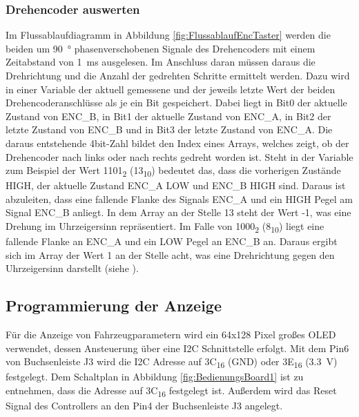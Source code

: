 \subsubsection{Drehencoder auswerten}\label{sec:Drehencoder}
Im Flussablaufdiagramm in Abbildung \ref{fig:FlussablaufEncTaster} werden die beiden um \SI{90}{\degree} phasenverschobenen Signale des Drehencoders mit einem Zeitabstand von \SI{1}{\milli\second} ausgelesen. Im Anschluss daran müssen daraus die Drehrichtung und die Anzahl der gedrehten Schritte ermittelt werden. Dazu wird in einer Variable der aktuell gemessene und der jeweils letzte Wert der beiden Drehencoderanschlüsse als je ein Bit gespeichert. Dabei liegt in Bit0 der aktuelle Zustand von ENC\_B, in Bit1 der aktuelle Zustand von ENC\_A, in Bit2 der letzte Zustand von ENC\_B und in Bit3 der letzte Zustand von ENC\_A. Die daraus entstehende 4bit-Zahl bildet den Index eines Arrays, welches zeigt, ob der Drehencoder nach links oder nach rechts gedreht worden ist. Steht in der Variable zum Beispiel der Wert 1101\textsubscript{2} (13\textsubscript{10}) bedeutet das, dass die vorherigen Zustände HIGH, der aktuelle Zustand ENC\_A LOW und ENC\_B HIGH sind. Daraus ist abzuleiten, dass eine fallende Flanke des Signals ENC\_A und ein HIGH Pegel am Signal ENC\_B anliegt. In dem Array an der Stelle 13 steht der Wert -1, was eine Drehung im Uhrzeigersinn repräsentiert. Im Falle von 1000\textsubscript{2} (8\textsubscript{10}) liegt eine fallende Flanke an ENC\_A und ein LOW Pegel an ENC\_B an. Daraus ergibt sich im Array der Wert 1 an der Stelle acht, was eine Drehrichtung gegen den Uhrzeigersinn darstellt (siehe \cite{ENC}).
\newpage
\subsection{Programmierung der Anzeige}\label{Sec6Sub2}
Für die Anzeige von Fahrzeugparametern wird ein 64x128 Pixel großes \ac{OLED} verwendet, dessen Ansteuerung über eine \ac{I2C} Schnittstelle erfolgt.  Mit dem Pin6 von Buchsenleiste J3 wird die \ac{I2C} Adresse auf 3C\textsubscript{16} (GND) oder 3E\textsubscript{16} (\SI{3,3}{\volt}) festgelegt. Dem Schaltplan in Abbildung \ref{fig:BedienungsBoard1} ist zu entnehmen, dass die Adresse auf 3C\textsubscript{16} festgelegt ist. Außerdem wird das Reset Signal des Controllers an den Pin4 der Buchsenleiste J3 angelegt.

